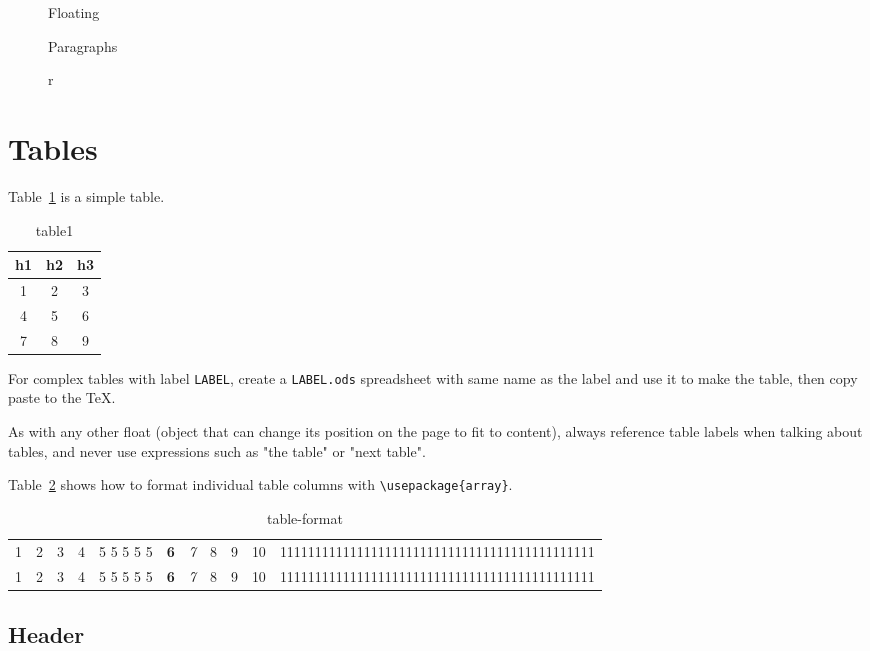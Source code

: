 \documentclass[12pt]{article}
\begin{document}
    \begin{figure}
        Floating

        Paragraphs

        r
    \end{figure}

\clearpage

\section{Tables}\label{table}

  Table~\ref{table1} is a simple table.

  \begin{table}
    \begin{tabular}{ccc}
      h1 & h2 & h3 \\
      \hline
      1 & 2 & 3 \\
      4 & 5 & 6 \\
      7 & 8 & 9 \\
    \end{tabular}
    \caption{table1}
    \label{table1}
  \end{table}

  For complex tables with label \lstinline|LABEL|, create a \lstinline|LABEL.ods| spreadsheet with same name as the label and use it to make the table, then copy paste to the TeX.

  As with any other float (object that can change its position on the page to fit to content), always reference table labels when talking about tables, and never use expressions such as "the table" or "next table".

  Table~\ref{table-format} shows how to format individual table columns with \lstinline|\usepackage{array}|.

  \begin{table}
    \begin{tabular}{l c rp{1cm} p{1cm} >{\bf}c >{\it}c | c || c @{abc} c c}
      1 & 2 & 3 & 4 & 5 5 5 5 5 & 6 & 7 & 8 & 9 & 10 & 111111111111111111111111111111111111111111111 \\
      1 & 2 & 3 & 4 & 5 5 5 5 5 & 6 & 7 & 8 & 9 & 10 & 111111111111111111111111111111111111111111111 \\
    \end{tabular}
    \caption{table-format}
    \label{table-format}
  \end{table}

  \subsection{Header}\label{table-header}
\end{document}
